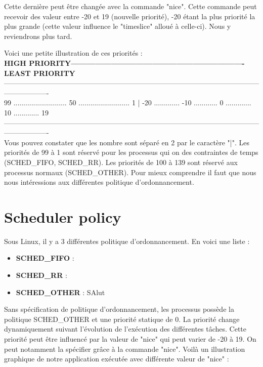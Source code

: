 Cette dernière peut être changée avec la commande "nice". Cette commande peut recevoir des valeur entre -20 et 19 (nouvelle priorité), -20 étant la plus priorité la plus grande (cette valeur influence le "timeslice" alloué à celle-ci). Nous y reviendrons plus tard.

Voici une petite illustration de ces priorités :\\

\textbf{HIGH PRIORITY----------------------------------------------------------------LEAST PRIORITY}\\
-------------------------------------------------------------------------------------------------------------------------------\\
99 ........................... 50 .......................... 1 | -20 ............. -10 ............ 0 ............. 10 ............. 19\\
-------------------------------------------------------------------------------------------------------------------------------\\

Vous pouvez constater que les nombre sont séparé en 2 par le caractère "|". Les priorités de 99 à 1 sont réservé pour les processus qui on des contraintes de temps (SCHED\_FIFO, SCHED\_RR). Les priorités de 100 à 139 sont réservé aux processus normaux (SCHED\_OTHER). Pour mieux comprendre il faut que nous nous intéressions aux différentes politique d'ordonnancement. 

\section{Scheduler policy}

Sous Linux, il y a 3 différentes politique d'ordonnancement. En voici une liste :
\begin{itemize}
\item \textbf{SCHED\_FIFO} : 
\item \textbf{SCHED\_RR} :
\item \textbf{SCHED\_OTHER} : SAlut\\
\end{itemize}

Sans spécification de politique d'ordonnancement, les processus possède la politique SCHED\_OTHER et une priorité statique de 0. La priorité change dynamiquement suivant l'évolution de l'exécution des différentes tâches. Cette priorité peut être influencé par la valeur de "nice" qui peut varier de -20 à 19. On peut notamment la spécifier grâce à la commande "nice". Voilà un illustration graphique de notre application exécutée avec différente valeur de "nice" :

